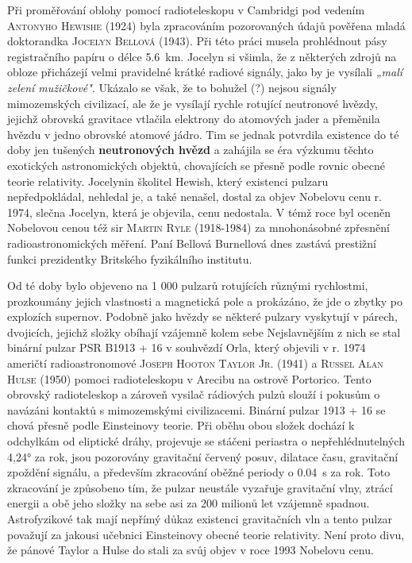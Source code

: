         Při proměřování oblohy pomocí radioteleskopu v Cambridgi pod vedením \textsc{Antonyho
        Hewishe} (1924) byla zpracováním pozorovaných údajů pověřena mladá doktorandka
        \textsc{Jocelyn Bellová} (1943). Při této práci musela prohlédnout pásy registračního papíru
        o délce \SI{5.6}{\km}. Jocelyn si všimla, že z některých zdrojů na obloze přicházejí velmi
        pravidelné krátké radiové signály, jako by je vysílali \emph{„malí zelení mužičkové"}.
        Ukázalo se však, že to bohužel (?) nejsou signály mimozemských civilizací, ale že je
        vysílají rychle rotující neutronové hvězdy, jejichž obrovská gravitace vtlačila elektrony do
        atomových jader a přeměnila hvězdu v jedno obrovské atomové jádro. Tim se jednak potvrdila
        existence do té doby jen tušených \textbf{neutronových hvězd} a zahájila se éra výzkumu
        těchto exotických astronomických objektů, chovajících se přesně podle rovnic obecné teorie
        relativity. Jocelynin školitel Hewish, který existenci pulzaru nepředpokládal, nehledal je,
        a také nenašel, dostal za objev Nobelovu cenu r. 1974, slečna Jocelyn, která je objevila,
        cenu nedostala. V témž roce byl oceněn Nobelovou cenou též sir \textsc{Martin Ryle}
        (1918-1984) za mnohonásobné zpřesnění radioastronomických měření. Paní Bellová Burnellová
        dnes zastává prestižní funkci prezidentky Britského fyzikálního institutu.

        Od té doby bylo objeveno na 1 000 pulzarů rotujících různými rychlostmi, prozkoumány jejich
        vlastnosti a magnetická pole a prokázáno, že jde o zbytky po explozích supernov. Podobně
        jako hvězdy se některé pulzary vyskytují v párech, dvojicích, jejichž složky obíhají
        vzájemně kolem sebe Nejslavnějším z nich se stal binární pulzar PSR B1913 + 16 v souhvězdí
        Orla, který objevili v r. 1974 američtí radioastronomové \textsc{Joseph Hooton Taylor Jr.}
        (1941) a \textsc{Russel Alan Hulse} (1950) pomoci radioteleskopu v Arecibu na ostrově
        Portorico. Tento obrovský radioteleskop a zároveň vysilač rádiových pulzů slouží i pokusům o
        navázáni kontaktů s mimozemskými civilizacemi. Binární pulzar 1913 + 16 se chová přesně
        podle Einsteinovy teorie. Při oběhu obou složek dochází k odchylkám od eliptické dráhy,
        projevuje se stáčeni periastra o nepřehlédnutelných \ang{4,24} za rok, jsou pozorovány
        gravitační červený posuv, dilatace času, gravitační zpoždění signálu, a především zkracování
        oběžné periody o \SI{0.04}{\s} za rok. Toto zkracování je způsobeno tím, že pulzar neustále
        vyzařuje gravitační vlny, ztrácí energii a obě jeho složky na sebe asi za 200 milionů let
        vzájemně spadnou. Astrofyzikové tak mají nepřímý důkaz existenci gravitačních vln a tento
        pulzar považují za jakousi učebnici Einsteinovy obecné teorie relativity. Není proto divu,
        že pánové Taylor a Hulse do stali za svůj objev v roce 1993 Nobelovu cenu.

